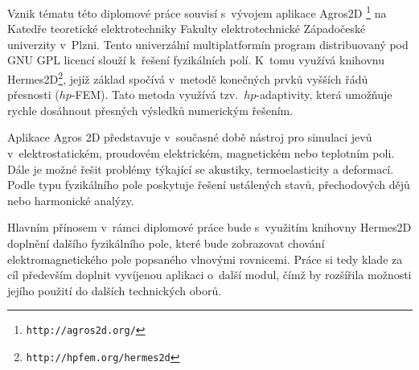 Vznik tématu této diplomové práce souvisí s~vývojem aplikace Agros2D \footnote{\texttt{http://agros2d.org/}} na Katedře teoretické elektrotechniky Fakulty elektrotechnické Západočeské univerzity v~Plzni. Tento univerzální multiplatformín program distribuovaný pod GNU GPL licencí slouží k~řešení fyzikálních polí. K~tomu využívá knihovnu Hermes2D\footnote{\texttt{http://hpfem.org/hermes2d}}, jejíž základ spočívá v~metodě konečných prvků vyšších řádů přesnosti ($hp$-FEM). Tato metoda využívá tzv.~$hp$-adaptivity, která umožňuje rychle dosáhnout přesných výsledků numerickým řešením.

Aplikace Agros 2D představuje v~současné době nástroj pro simulaci jevů v~elektrostatickém, proudovém elektrickém, magnetickém nebo teplotním poli. Dále je možné řešit problémy týkající se akustiky, termoelasticity a deformací. Podle typu fyzikálního pole poskytuje řešení ustálených stavů, přechodových dějů nebo harmonické analýzy.  

Hlavním přínosem v~rámci diplomové práce bude s~využitím knihovny Hermes2D doplnění dalšího fyzikálního pole, které bude zobrazovat chování elektromagnetického pole popsaného vlnovými rovnicemi. Práce si tedy klade za cíl především doplnit vyvíjenou aplikaci o~další modul, čímž by rozšířila možnosti jejího použití do dalších technických oborů. 
